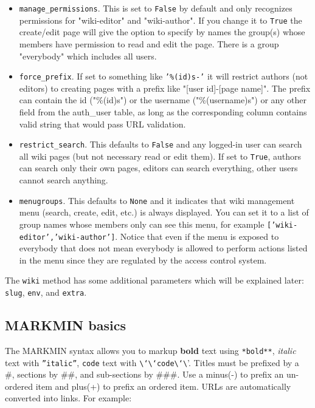 \documentclass[justified,sixbynine,notoc]{tufte-book}
\def\ft{\small\tt}
\begin{document}
\begin{fullwidth}
\begin{itemize}
\item {\ft manage\_permissions}. This is set to {\ft False} by default and only recognizes permissions for "wiki-editor" and "wiki-author". If you change it to {\ft True} the create/edit page will give the option to specify by names the group(s) whose members have permission to read and edit the page. There is a group "everybody" which includes all users.

\item {\ft force\_prefix}. If set to something like {\ft '\%(id)s-'} it will restrict authors (not editors) to creating pages with a prefix like "[user id]-[page name]". The prefix can contain the id ("\%(id)s") or the username ("\%(username)s") or any other field from the auth\_user table, as long as the corresponding column contains valid string that would pass URL validation.

\item {\ft restrict\_search}. This defaults to {\ft False} and any logged-in user can search all wiki pages (but not necessary read or edit them). If set to {\ft True}, authors can search only their own pages, editors can search everything, other users cannot search anything.

\item {\ft menugroups}. This defaults to {\ft None} and it indicates that wiki management menu (search, create, edit, etc.) is always displayed. You can set it to a list of group names whose members only can see this menu, for example {\ft ['wiki-editor','wiki-author']}. Notice that even if the menu is exposed to everybody that does not mean everybody is allowed to perform actions listed in the menu since they are regulated by the access control system.
\end{itemize}

The {\ft wiki} method has some additional parameters which will be explained later: {\ft slug}, {\ft env}, and {\ft extra}.

\goodbreak\subsection{MARKMIN basics}

The MARKMIN syntax allows you to markup {\bf bold} text using {\ft **bold**}, {\it italic} text with {\ft ''italic''}, {\ft code} text with {\ft {\textbackslash}`{\textbackslash}`code{\textbackslash}`{\textbackslash}}'. Titles must be prefixed by a \#, sections by \#\#, and sub-sections by \#\#\#. Use a minus(-) to prefix an un-ordered item and plus(+) to prefix an ordered item. URLs are automatically converted into links. For example:


\end{fullwidth}
\end{document}
